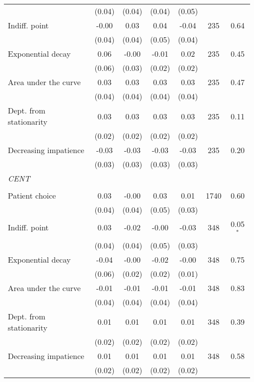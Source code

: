 {\begin{tabular}{l*{6}{c}}
          &   (0.04)&   (0.04)&   (0.04)&   (0.05)&         &         \\
Indiff. point&    -0.00&     0.03&     0.04&    -0.04&      235&     0.64\\
          &   (0.04)&   (0.04)&   (0.05)&   (0.04)&         &         \\
Exponential decay&     0.06&    -0.00&    -0.01&     0.02&      235&     0.45\\
          &   (0.06)&   (0.03)&   (0.02)&   (0.02)&         &         \\
Area under the curve&     0.03&     0.03&     0.03&     0.03&      235&     0.47\\
          &   (0.04)&   (0.04)&   (0.04)&   (0.04)&         &         \\
Dept. from stationarity&     0.03&     0.03&     0.03&     0.03&      235&     0.11\\
          &   (0.02)&   (0.02)&   (0.02)&   (0.02)&         &         \\
Decreasing impatience&    -0.03&    -0.03&    -0.03&    -0.03&      235&     0.20\\
          &   (0.03)&   (0.03)&   (0.03)&   (0.03)&         &         \\
\textit{CENT}&         &         &         &         &         &         \\
          &         &         &         &         &         &         \\
Patient choice&     0.03&    -0.00&     0.03&     0.01&     1740&     0.60\\
          &   (0.04)&   (0.04)&   (0.05)&   (0.03)&         &         \\
Indiff. point&     0.03&    -0.02&    -0.00&    -0.03&      348&0.05$^{*}$\\
          &   (0.04)&   (0.04)&   (0.05)&   (0.03)&         &         \\
Exponential decay&    -0.04&    -0.00&    -0.02&    -0.00&      348&     0.75\\
          &   (0.06)&   (0.02)&   (0.02)&   (0.01)&         &         \\
Area under the curve&    -0.01&    -0.01&    -0.01&    -0.01&      348&     0.83\\
          &   (0.04)&   (0.04)&   (0.04)&   (0.04)&         &         \\
Dept. from stationarity&     0.01&     0.01&     0.01&     0.01&      348&     0.39\\
          &   (0.02)&   (0.02)&   (0.02)&   (0.02)&         &         \\
Decreasing impatience&     0.01&     0.01&     0.01&     0.01&      348&     0.58\\
          &   (0.02)&   (0.02)&   (0.02)&   (0.02)&         &         \\
\bottomrule
\end{tabular}
}

